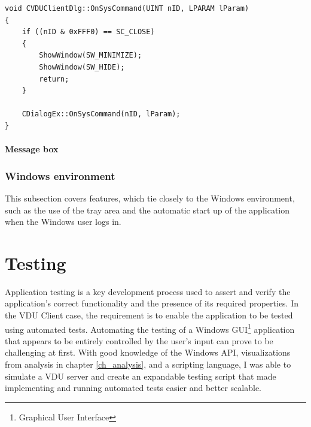 \begin{lstlisting}[caption={Overriding system close command to hide the dialog window}, label=sysclose]
void CVDUClientDlg::OnSysCommand(UINT nID, LPARAM lParam)
{
	if ((nID & 0xFFF0) == SC_CLOSE)
	{
		ShowWindow(SW_MINIMIZE);
		ShowWindow(SW_HIDE);
		return;
	}

	CDialogEx::OnSysCommand(nID, lParam);
}
\end{lstlisting}

\subsubsection{Message box}

\subsection{Windows environment}
This subsection covers features, which tie closely to the Windows environment, such as the use of the tray area and the automatic start up of the application when the Windows user logs in.

\subsubsection{}

\chapter{Testing}
\label{ch_testing}
Application testing is a key development process used to assert and verify the application's correct functionality and the presence of its required properties. In the VDU Client case, the requirement is to enable the application to be tested using automated tests. Automating the testing of a Windows GUI\footnote{Graphical User Interface} application that appears to be entirely controlled by the user's input can prove to be challenging at first. With good knowledge of the Windows API, visualizations from analysis in chapter \ref{ch_analysis}, and a scripting language, I was able to simulate a VDU server and create an expandable testing script that made implementing and running automated tests easier and better scalable.

